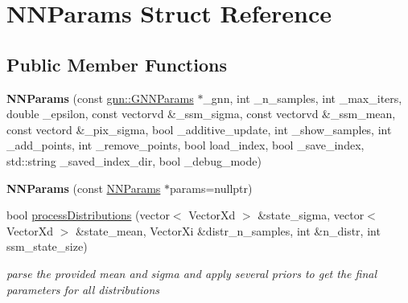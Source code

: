 \hypertarget{structNNParams}{\section{N\-N\-Params Struct Reference}
\label{structNNParams}
}
\subsection*{Public Member Functions}
\begin{DoxyCompactItemize}
\item 
\hypertarget{structNNParams_a80b48970138a4d519cb4b842ddb53b7a}{{\bfseries N\-N\-Params} (const \hyperlink{structgnn_1_1GNNParams}{gnn\-::\-G\-N\-N\-Params} $\ast$\-\_\-gnn, int \-\_\-n\-\_\-samples, int \-\_\-max\-\_\-iters, double \-\_\-epsilon, const vectorvd \&\-\_\-ssm\-\_\-sigma, const vectorvd \&\-\_\-ssm\-\_\-mean, const vectord \&\-\_\-pix\-\_\-sigma, bool \-\_\-additive\-\_\-update, int \-\_\-show\-\_\-samples, int \-\_\-add\-\_\-points, int \-\_\-remove\-\_\-points, bool load\-\_\-index, bool \-\_\-save\-\_\-index, std\-::string \-\_\-saved\-\_\-index\-\_\-dir, bool \-\_\-debug\-\_\-mode)}\label{structNNParams_a80b48970138a4d519cb4b842ddb53b7a}

\item 
\hypertarget{structNNParams_ad125229599b8830f9a5a0f8d40d429c5}{{\bfseries N\-N\-Params} (const \hyperlink{structNNParams}{N\-N\-Params} $\ast$params=nullptr)}\label{structNNParams_ad125229599b8830f9a5a0f8d40d429c5}

\item 
\hypertarget{structNNParams_aa25a01d07eecc9e9df8669e6267e7b16}{bool \hyperlink{structNNParams_aa25a01d07eecc9e9df8669e6267e7b16}{process\-Distributions} (vector$<$ Vector\-Xd $>$ \&state\-\_\-sigma, vector$<$ Vector\-Xd $>$ \&state\-\_\-mean, Vector\-Xi \&distr\-\_\-n\-\_\-samples, int \&n\-\_\-distr, int ssm\-\_\-state\-\_\-size)}\label{structNNParams_aa25a01d07eecc9e9df8669e6267e7b16}

\begin{DoxyCompactList}\small\item\em parse the provided mean and sigma and apply several priors to get the final parameters for all distributions \end{DoxyCompactList}\end{DoxyCompactItemize}

